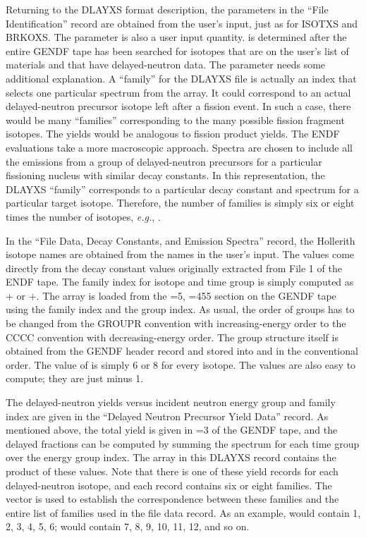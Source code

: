 Returning to the DLAYXS format description, the parameters in the
``File Identification'' record are obtained from the user's input,
just as for ISOTXS and BRKOXS.  The parameter  is also
a user input quantity.   is determined after the entire
GENDF tape has been searched for isotopes that are on the user's list
of  materials and that have delayed-neutron data.
The  parameter needs some additional explanation.
A ``family'' for the DLAYXS file is actually an index that selects
one particular spectrum from the  array.  It could
correspond to an actual delayed-neutron precursor isotope left after
a fission event.  In such a case, there would be many ``families''
corresponding to the many possible fission fragment isotopes.
The  yields would be analogous to fission product
yields.  The ENDF evaluations take a more macroscopic approach.
Spectra are chosen to include all the emissions from a group of
delayed-neutron precursors for a particular fissioning nucleus with
similar decay constants.  In this representation, the DLAYXS ``family''
corresponds to a particular decay constant and spectrum for a
particular target isotope.  Therefore, the number of families is
simply six or eight times the number of isotopes, {\it e.g.},
.

In the ``File Data, Decay Constants, and Emission Spectra'' record,
the Hollerith isotope names  are obtained from the names
in the user's input.  The  values come directly from the
decay constant values originally extracted from File 1 of the ENDF tape.
The family index for isotope  and time group  is
simply computed as + or +.
The  array is loaded from the =5, =455 section
on the GENDF tape using the family index and the group index.  As usual, the
order of groups has to be changed from the GROUPR convention with
increasing-energy order to the CCCC convention with decreasing-energy
order.  The group structure itself is obtained from the GENDF header
record and stored into  and  in the
conventional order.  The value of  is simply 6 or 8
for every isotope.  The  values are also easy to compute;
they are just  minus 1.

The delayed-neutron yields versus incident neutron energy group and
family index are given in the ``Delayed Neutron Precursor Yield Data''
record.  As mentioned above, the total yield is given in =3 of the
GENDF tape, and the delayed fractions can be computed by summing the
spectrum for each time group over the energy group index.  The array
 in this DLAYXS record contains the product of these
values.  Note that there is one of these yield records for each
delayed-neutron isotope, and each record contains six or eight families.
The  vector is used to establish the correspondence
between these families and the entire list of families used in the
file data record.  As an example,  would contain
1, 2, 3, 4, 5, 6;  would contain 7, 8, 9, 10, 11,
12, and so on.

